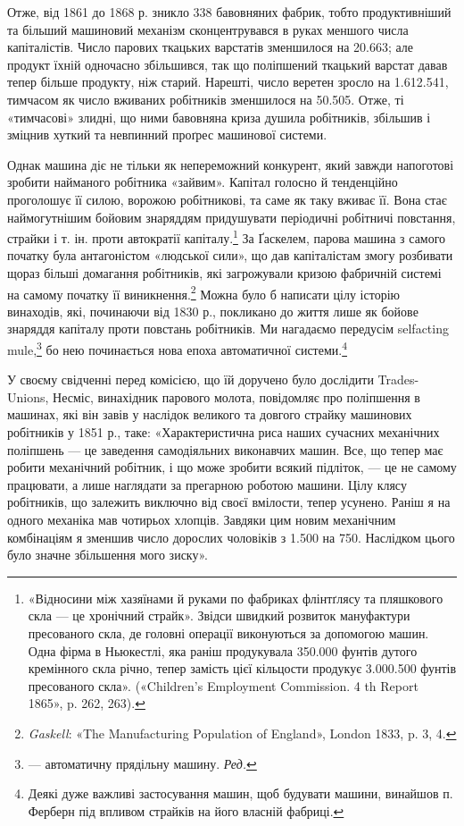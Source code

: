 Отже, від 1861 до 1868 р. зникло 338 бавовняних фабрик, тобто
продуктивніший та більший машиновий механізм сконцентрувався
в руках меншого числа капіталістів. Число парових ткацьких
варстатів зменшилося на 20.663; але продукт їхній одночасно
збільшився, так що поліпшений ткацький варстат давав
тепер більше продукту, ніж старий. Нарешті, число веретен
зросло на 1.612.541, тимчасом як число вживаних робітників
зменшилося на 50.505. Отже, ті «тимчасові» злидні, що ними бавовняна
криза душила робітників, збільшив і зміцнив хуткий
та невпинний проґрес машинової системи.

Однак машина діє не тільки як непереможний конкурент,
який завжди напоготові зробити найманого робітника «зайвим».
Капітал голосно й тенденційно проголошує її силою, ворожою
робітникові, та саме як таку вживає її. Вона стає наймогутнішим
бойовим знаряддям придушувати періодичні робітничі повстання,
страйки і т. ін. проти автократії капіталу.\footnote{
«Відносини між хазяїнами й руками по фабриках флінтґлясу та пляшкового
скла — це хронічний страйк». Звідси швидкий розвиток мануфактури
пресованого скла, де головні операції виконуються за допомогою машин.
Одна фірма в Ньюкестлі, яка раніш продукувала 350.000 фунтів дутого
кремінного скла річно, тепер замість цієї кільцости продукує 3.000.500
фунтів пресованого скла». («Children’s Employment Commission. 4 th
Report 1865», p. 262, 263).
} За Ґаскелем,
парова машина з самого початку була антагоністом «людської
сили», що дав капіталістам змогу розбивати щораз більші
домагання робітників, які загрожували кризою фабричній системі
на самому початку її виникнення.\footnote{
\emph{Gaskell}: «The Manufacturing Population of England», London
1833, p. 3, 4.
} Можна було б написати
цілу історію винаходів, які, починаючи від 1830 р., покликано
до життя лише як бойове знаряддя капіталу проти повстань робітників.
Ми нагадаємо передусім selfacting mule,\footnote*{
— автоматичну прядільну машину. \emph{Ред.}
} бо нею починається
нова епоха автоматичної системи.\footnote{
Деякі дуже важливі застосування машин, щоб будувати машини,
винайшов п. Ферберн під впливом страйків на його власній фабриці.
}

У своєму свідченні перед комісією, що їй доручено було дослідити
Trades-Unions, Несміс, винахідник парового молота, повідомляє
про поліпшення в машинах, які він завів у наслідок
великого та довгого страйку машинових робітників у 1851 р.,
таке: «Характеристична риса наших сучасних механічних поліпшень
— це заведення самодіяльних виконавчих машин. Все, що
тепер має робити механічний робітник, і що може зробити всякий
підліток, — це не самому працювати, а лише наглядати за прегарною
роботою машини. Цілу клясу робітників, що залежить
виключно від своєї вмілости, тепер усунено. Раніш я на одного
механіка мав чотирьох хлопців. Завдяки цим новим механічним
комбінаціям я зменшив число дорослих чоловіків з 1.500 на 750.
Наслідком цього було значне збільшення мого зиску».

